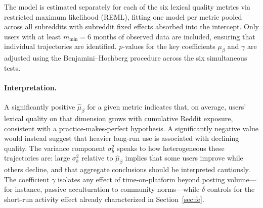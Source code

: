 The model is estimated separately for each of the six lexical quality
metrics via restricted maximum likelihood (REML), fitting one model
per metric pooled across all subreddits with subreddit fixed effects
absorbed into the intercept.  Only users with at least
$m_{\min} = 6$ months of observed data are included, ensuring that
individual trajectories are identified.  $p$-values for the key
coefficients $\mu_{\beta}$ and $\gamma$ are adjusted using the
Benjamini--Hochberg procedure across the six simultaneous tests.

\paragraph{Interpretation.}
A significantly positive $\hat{\mu}_{\beta}$ for a given metric
indicates that, on average, users' lexical quality on that dimension
grows with cumulative Reddit exposure, consistent with a
practice-makes-perfect hypothesis.  A significantly negative value
would instead suggest that heavier long-run use is associated with
declining quality.  The variance component $\sigma_{b}^{2}$ speaks
to how heterogeneous these trajectories are: large $\sigma_{b}^{2}$
relative to $\hat{\mu}_{\beta}$ implies that some users improve
while others decline, and that aggregate conclusions should be
interpreted cautiously.  The coefficient $\gamma$ isolates any
effect of time-on-platform beyond posting volume---for instance,
passive acculturation to community norms---while $\delta$ controls
for the short-run activity effect already characterized in
Section~\ref{sec:fe}.
